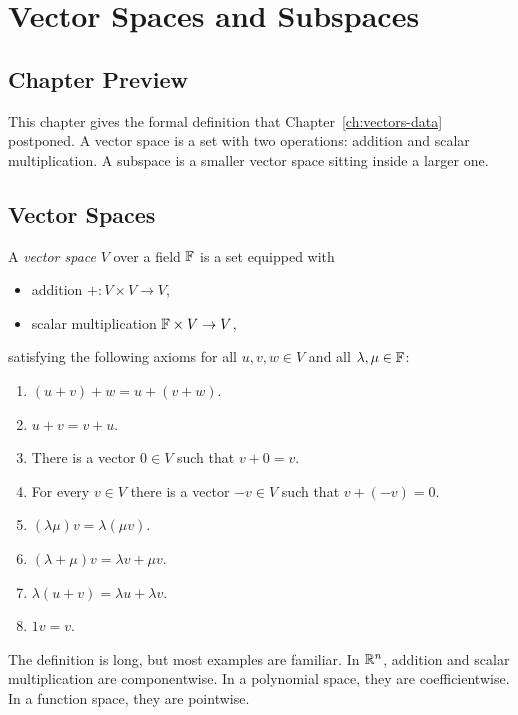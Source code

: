 \chapter{Vector Spaces and Subspaces}
\label{ch:vector-spaces-subspaces}

\section*{Chapter Preview}

This chapter gives the formal definition that Chapter~\ref{ch:vectors-data}
postponed. A vector space is a set with two operations: addition and scalar
multiplication. A subspace is a smaller vector space sitting inside a larger
one.

\section{Vector Spaces}

\begin{definition}
  A \emph{vector space} $V$ over a field $\mathbb{F}$ is a set equipped with
  \begin{itemize}
    \item addition $+:V\times V\to V$,
    \item scalar multiplication $\mathbb{F}\times V\to V$,
  \end{itemize}
  satisfying the following axioms for all $u,v,w\in V$ and all
  $\lambda,\mu\in\mathbb{F}$:
  \begin{enumerate}
    \item $(u+v)+w=u+(v+w)$.
    \item $u+v=v+u$.
    \item There is a vector $0\in V$ such that $v+0=v$.
    \item For every $v\in V$ there is a vector $-v\in V$ such that
      $v+(-v)=0$.
    \item $(\lambda\mu)v=\lambda(\mu v)$.
    \item $(\lambda+\mu)v=\lambda v+\mu v$.
    \item $\lambda(u+v)=\lambda u+\lambda v$.
    \item $1v=v$.
  \end{enumerate}
\end{definition}

The definition is long, but most examples are familiar. In $\mathbb{R}^n$, addition
and scalar multiplication are componentwise. In a polynomial space, they are
coefficientwise. In a function space, they are pointwise.

